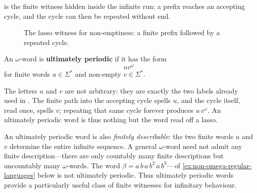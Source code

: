  is the finite witness hidden inside the infinite
run: a prefix reaches an accepting cycle, and the cycle can then be
repeated without end.

\begin{figure}[ht]
\centering
{}
\caption{The lasso witness for non-emptiness: a finite prefix followed by a repeated cycle.}
\label{fig:buchi-lasso}
\end{figure}

\begin{definition}
\label{def:ultimately-periodic}
An $\omega$-word is \textbf{ultimately periodic} if it has the form
\[
  uv^\omega
\]
for finite words $u\in\Sigma^*$ and non-empty $v\in\Sigma^*$.
\end{definition}


The letters $u$ and $v$ are not arbitrary: they are exactly the two
labels already used in .  The finite path into the
accepting cycle spells $u$, and the cycle itself, read once, spells $v$;
repeating that same cycle forever produces $u\,v^\omega$.  An ultimately
periodic word is thus nothing but the word read off a lasso.

An ultimately periodic word is also \emph{finitely describable}: the two
finite words $u$ and $v$ determine the entire infinite sequence.  A
general $\omega$-word need not admit any finite description---there are
only countably many finite descriptions but uncountably many
$\omega$-words.  The word $\beta=a\,b\,a\,b^2\,a\,b^3\cdots$ of
\cref{ex:non-omega-regular-languages} below is not ultimately periodic.
Thus ultimately periodic words provide a particularly useful class of
finite witnesses for infinitary behaviour.

